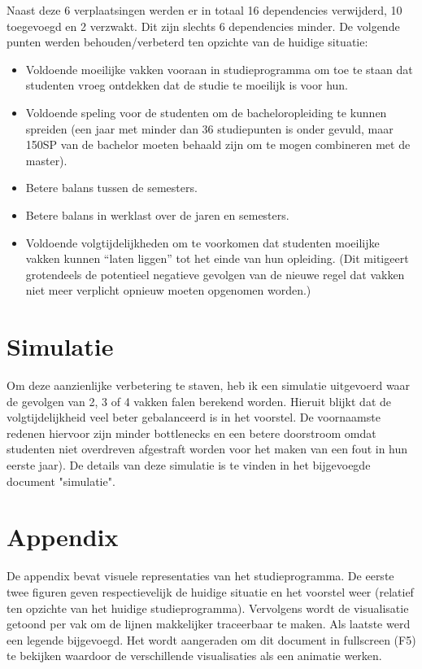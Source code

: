 \documentclass[a4paper]{article}
\begin{document}
    Naast deze 6 verplaatsingen werden er in totaal 16 dependencies verwijderd, 10 toegevoegd en 2 verzwakt. Dit zijn slechts 6 dependencies minder. De volgende punten werden behouden/verbeterd ten opzichte van de huidige situatie:
    \begin{itemize}
        \item Voldoende moeilijke vakken vooraan in studieprogramma om toe te staan dat studenten vroeg ontdekken dat de studie te moeilijk is voor hun.
        \item Voldoende speling voor de studenten om de bacheloropleiding te kunnen spreiden (een jaar met minder dan 36 studiepunten is onder gevuld, maar 150SP van de bachelor moeten behaald zijn om te mogen combineren met de master).
        \item Betere balans tussen de semesters.
        \item Betere balans in werklast over de jaren en semesters.
        \item Voldoende volgtijdelijkheden om te voorkomen dat studenten moeilijke vakken kunnen “laten liggen” tot het einde van hun opleiding. (Dit mitigeert grotendeels de potentieel negatieve gevolgen van de nieuwe regel dat vakken niet meer verplicht opnieuw moeten opgenomen worden.)
    \end{itemize}

    \section{Simulatie}
    \label{sec:simulatie}

    Om deze aanzienlijke verbetering te staven, heb ik een simulatie uitgevoerd waar de gevolgen van 2, 3 of 4 vakken falen berekend worden. Hieruit blijkt dat de volgtijdelijkheid veel beter gebalanceerd is in het voorstel. De voornaamste redenen hiervoor zijn minder bottlenecks en een betere doorstroom omdat studenten niet overdreven afgestraft worden voor het maken van een fout in hun eerste jaar). De details van deze simulatie is te vinden in het bijgevoegde document "simulatie".

    \appendix
    \section{Appendix}
    \label{sec:appenix}

    De appendix bevat visuele representaties van het studieprogramma. De eerste twee figuren geven respectievelijk de huidige situatie en het voorstel weer (relatief ten opzichte van het huidige studieprogramma). Vervolgens wordt de visualisatie getoond per vak om de lijnen makkelijker traceerbaar te maken. Als laatste werd een legende bijgevoegd. Het wordt aangeraden om dit document in fullscreen (F5) te bekijken waardoor de verschillende visualisaties als een animatie werken.
\end{document}
